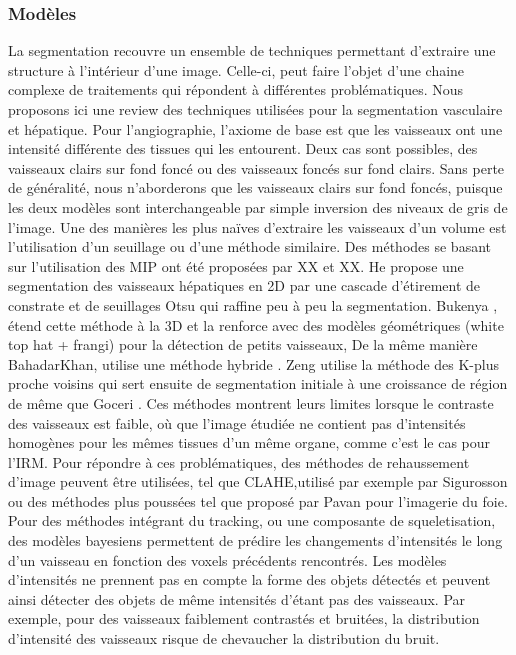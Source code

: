 \subsubsection{Modèles}

La segmentation recouvre un ensemble de techniques permettant d'extraire une structure à l'intérieur d'une image. Celle-ci, peut faire l'objet d'une chaine complexe de traitements qui répondent à différentes problématiques. Nous proposons ici une review des techniques utilisées pour la segmentation vasculaire et hépatique.
Pour l'angiographie, l'axiome de base est que les vaisseaux ont une intensité différente des tissues qui les entourent. Deux cas sont possibles, des vaisseaux clairs sur fond foncé ou des vaisseaux foncés sur fond clairs. Sans perte de généralité, nous n'aborderons que les vaisseaux clairs sur fond foncés, puisque les deux modèles sont interchangeable par simple inversion des niveaux de gris de l'image.
Une des manières les plus naïves d'extraire les vaisseaux d'un volume est l'utilisation d'un seuillage ou d'une méthode similaire. Des méthodes se basant sur l'utilisation des MIP ont été proposées par XX et XX. He \cite{He2013_multi_otsu} propose une segmentation des vaisseaux hépatiques en 2D par une cascade d'étirement de constrate et de seuillages Otsu qui raffine peu à peu la segmentation. Bukenya \cite{Bukenya2016_multi_otsu}, étend cette méthode à la 3D et la renforce avec des modèles géométriques (white top hat + frangi) pour la détection de petits vaisseaux, De la même manière BahadarKhan, utilise une méthode hybride \cite{Bahadarkhan2016_fundus_region_based_otsu}. Zeng \cite{Zeng2018_auto_RG_AC_hepatic_vessels} utilise la méthode des K-plus proche voisins qui sert ensuite de segmentation initiale à une croissance de région de même que Goceri \cite{Goceri2017_vessel}. Ces méthodes montrent leurs limites lorsque le contraste des vaisseaux est faible, où que l'image étudiée ne contient pas d'intensités homogènes pour les mêmes tissues d'un même organe, comme c'est le cas pour l'IRM. Pour répondre à ces problématiques, des méthodes de rehaussement d'image peuvent être utilisées, tel que CLAHE,utilisé par exemple par Sigurosson \cite{Sigurosson2014_retinal_morpho_fuzzy} ou des méthodes plus poussées tel que proposé par Pavan \cite{Pavan2018_HCC_detection} pour l'imagerie du foie.
Pour des méthodes intégrant du tracking, ou une composante de squeletisation, des modèles bayesiens permettent de prédire les changements d'intensités le long d'un vaisseau en fonction des voxels précédents rencontrés. \cite{Radojevic2015_fuzzy_logic}\cite{Radojevic2017_neurons_bayesian_tracing_density}
Les modèles d'intensités ne prennent pas en compte la forme des objets détectés et peuvent ainsi détecter des objets de même intensités d'étant pas des vaisseaux. Par exemple, pour des vaisseaux faiblement contrastés et bruitées, la distribution d'intensité des vaisseaux risque de chevaucher la distribution du bruit.

